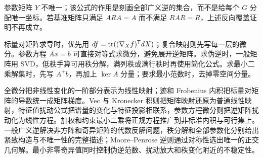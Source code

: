 \begin{remark}
参数矩阵 $Y$ 不唯一；该公式的作用是刻画全部广义逆的集合，而不是给每个 $G$ 分配唯一坐标。若基准矩阵只满足 $ARA=A$ 而不满足 $RAR=R$，上述反向覆盖证明不再成立。
\end{remark}

\begin{method}[矩阵求导与伪逆题的方法选择]
标量对矩阵求导时，优先用 $df=\operatorname{tr}((\nabla_Xf)^{\mathsf T}dX)$；复合映射则先写每一层的微分。参数方程 $Ax=b$ 可直接对等式求微分，避免展开逆矩阵。求伪逆时，一般矩阵用 SVD，低秩手算可用秩分解，满列秩或满行秩时再使用简化公式。求最小二乘解集时，先写 $A^+b$，再加上 $\ker A$ 分量；要求最小范数时，去掉零空间分量。
\end{method}

\begin{summary}[本章知识链]
全微分把非线性变化的一阶部分表示为线性映射；迹和 Frobenius 内积把标量对矩阵的导数统一成矩阵梯度。Vec 与 Kronecker 积则把矩阵映射还原为普通线性映射，特征值扰动公式把谱量的变化与特征投影相联系，参数方程微分则把逆矩阵扰动化为线性方程。加权和约束最小二乘将正规方程推广到非标准内积与可行集上。一般广义逆解决非方阵和奇异矩阵的代数反解问题，秩分解和全部参数化分别给出紧致构造与不唯一性的完整描述；Moore--Penrose 逆则通过对称性选出唯一的正交几何解。最小非零奇异值同时控制伪逆范数、扰动放大和秩变化附近的不稳定性。
\end{summary}
